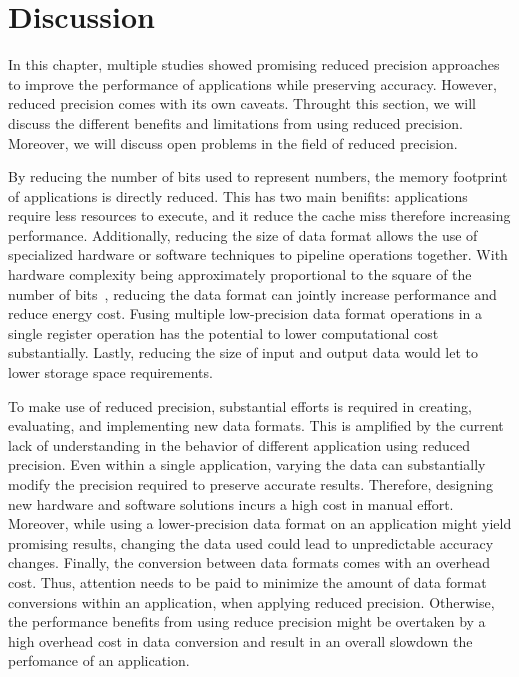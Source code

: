 \section{Discussion}
In this chapter, multiple studies showed promising reduced precision approaches
to improve the performance of applications while preserving accuracy.
However, reduced precision comes with its own caveats.
Throught this section, we will discuss the different benefits and limitations from
using reduced precision.
Moreover, we will discuss open problems in the field of reduced precision.

By reducing the number of bits used to represent numbers, the memory footprint
of applications is directly reduced.
This has two main benifits: applications require less resources to execute, and 
it reduce the cache miss therefore increasing performance.
Additionally, reducing the size of data format allows the use of specialized hardware
or software techniques to pipeline operations together.
With hardware complexity being approximately proportional to the square of the 
number of bits~\cite{Chen2018-an}, reducing the data format can jointly increase
performance and reduce energy cost.
Fusing multiple low-precision data format operations in a single register operation 
has the potential to lower computational cost substantially.
Lastly, reducing the size of input and output data would let to lower storage space requirements.

To make use of reduced precision, substantial efforts is required in creating, 
evaluating, and implementing new data formats.
This is amplified by the current lack of understanding in the 
behavior of different application using reduced precision.
Even within a single application, varying the data can substantially modify the 
precision required to preserve accurate results.
Therefore, designing new hardware and software solutions incurs a high cost in manual effort.
Moreover, while using a lower-precision data format on an application might yield 
promising results, changing the data used could lead to unpredictable accuracy changes.
Finally, the conversion between data formats comes with an overhead cost.
Thus, attention needs to be paid to minimize the amount of data format conversions 
within an application, when applying reduced precision.
Otherwise, the performance benefits from using reduce precision might be overtaken
by a high overhead cost in data conversion and result in an overall slowdown 
the perfomance of an application.

